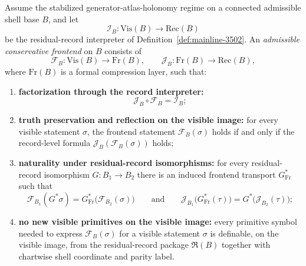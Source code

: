 \begin{definition}
\label{def:mainline-3600}
Assume the stabilized generator-atlas-holonomy regime on a connected admissible shell base $B$, and let
\[
  \mathcal I_B : \mathrm{Vis}(B) \longrightarrow \mathrm{Rec}(B)
\]
be the residual-record interpreter of Definition~\ref{def:mainline-3502}. An \emph{admissible conservative frontend} on $B$ consists of
\[
  \mathcal F_B : \mathrm{Vis}(B) \longrightarrow \mathrm{Fr}(B),
  \qquad
  \mathcal J_B : \mathrm{Fr}(B) \longrightarrow \mathrm{Rec}(B),
\]
where $\mathrm{Fr}(B)$ is a formal compression layer, such that:
\begin{enumerate}[label=(\roman*), leftmargin=2em]
  \item \textbf{factorization through the record interpreter:}
  \[
    \mathcal J_B\circ \mathcal F_B = \mathcal I_B;
  \]
  \item \textbf{truth preservation and reflection on the visible image:} for every visible statement $\sigma$, the frontend statement $\mathcal F_B(\sigma)$ holds if and only if the record-level formula $\mathcal J_B(\mathcal F_B(\sigma))$ holds;
  \item \textbf{naturality under residual-record isomorphisms:} for every residual-record isomorphism $G:B_1\to B_2$ there is an induced frontend transport $G^*_{\mathrm{Fr}}$ such that
  \[
    \mathcal F_{B_1}(G^*\sigma)=G^*_{\mathrm{Fr}}\bigl(\mathcal F_{B_2}(\sigma)\bigr)
    \qquad\text{and}\qquad
    \mathcal J_{B_1}\bigl(G^*_{\mathrm{Fr}}(\tau)\bigr)=G^*\bigl(\mathcal J_{B_2}(\tau)\bigr);
  \]
  \item \textbf{no new visible primitives on the visible image:} every primitive symbol needed to express $\mathcal F_B(\sigma)$ for a visible statement $\sigma$ is definable, on the visible image, from the residual-record package $\mathfrak R(B)$ together with chartwise shell coordinate and parity label.
\end{enumerate}
\end{definition}

